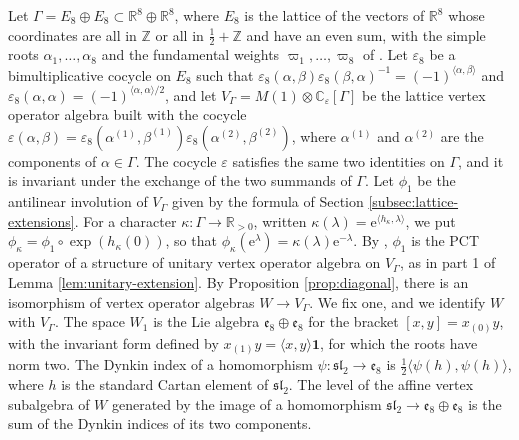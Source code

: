 \documentclass[leqno]{article}
\newcommand{\Cbb}{\ensuremath{\mathbb{C}}}
\newcommand{\Z}{\ensuremath{\mathbb{Z}}}
\newcommand{\R}{\ensuremath{\mathbb{R}}}
\newcommand{\co}{\colon}
\newcommand{\ot}{\otimes}
\newcommand{\epsi}{\varepsilon}
\newcommand{\e}{\mathrm{e}} %
\numberwithin{equation}{section}
\begin{document}
Let $\Gamma = E_8 \oplus E_8 \subset \R^8 \oplus \R^8$, where $E_8$ is the lattice of the vectors of $\R^8$ whose coordinates are all in $\Z$ or all in $\frac12+\Z$ and have an even sum, with the simple roots $\alpha_1, \ldots, \alpha_8$ and the fundamental weights $\varpi_1, \ldots, \varpi_8$ of \cite[Planche VII]{Bou68}. Let $\epsi_8$ be a bimultiplicative cocycle on $E_8$ such that $\epsi_8(\alpha,\beta)\epsi_8(\beta,\alpha)^{-1} = (-1)^{\langle\alpha,\beta\rangle}$ and $\epsi_8(\alpha,\alpha) = (-1)^{\langle\alpha,\alpha\rangle/2}$, and let $V_\Gamma = M(1) \ot \Cbb_\epsi[\Gamma]$ be the lattice vertex operator algebra built with the cocycle $\epsi(\alpha,\beta) = \epsi_8(\alpha^{(1)},\beta^{(1)})\epsi_8(\alpha^{(2)},\beta^{(2)})$, where $\alpha^{(1)}$ and $\alpha^{(2)}$ are the components of $\alpha \in \Gamma$. The cocycle $\epsi$ satisfies the same two identities on $\Gamma$, and it is invariant under the exchange of the two summands of $\Gamma$. Let $\phi_1$ be the antilinear involution of $V_\Gamma$ given by the formula of Section \ref{subsec:lattice-extensions}. For a character $\kappa \co \Gamma \to \R_{>0}$, written $\kappa(\lambda) = \e^{\langle h_\kappa,\lambda\rangle}$, we put $\phi_\kappa = \phi_1 \circ \exp(h_\kappa(0))$, so that $\phi_\kappa(\e^\lambda) = \kappa(\lambda)\e^{-\lambda}$. By \cite[Theorem 4.12 p.~24]{DoL14}, $\phi_1$ is the PCT operator of a structure of unitary vertex operator algebra on $V_\Gamma$, as in part 1 of Lemma \ref{lem:unitary-extension}. By Proposition \ref{prop:diagonal}, there is an isomorphism of vertex operator algebras $W \to V_\Gamma$. We fix one, and we identify $W$ with $V_\Gamma$. The space $W_1$ is the Lie algebra $\mathfrak e_8 \oplus \mathfrak e_8$ for the bracket $[x,y] = x_{(0)}y$, with the invariant form defined by $x_{(1)}y = \langle x,y\rangle\mathbf 1$, for which the roots have norm two. The Dynkin index of a homomorphism $\psi \co \mathfrak{sl}_2 \to \mathfrak e_8$ is $\frac12\langle\psi(h),\psi(h)\rangle$, where $h$ is the standard Cartan element of $\mathfrak{sl}_2$. The level of the affine vertex subalgebra of $W$ generated by the image of a homomorphism $\mathfrak{sl}_2 \to \mathfrak e_8 \oplus \mathfrak e_8$ is the sum of the Dynkin indices of its two components.
\end{document}
